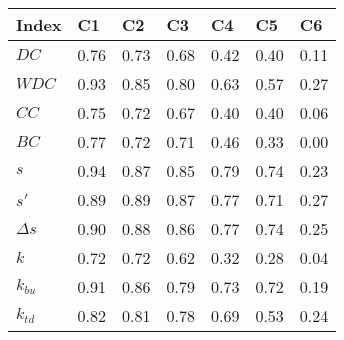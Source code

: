 \begin{table}[ht]
\centering
\begin{tabular}{lllllll}
  \hline
Index & C1 & C2 & C3 & C4 & C5 & C6 \\ 
  \hline
\(\displaystyle DC \) & {\color[HTML]{00D768} 0.76} & {\color[HTML]{EF2A00} 0.73} & {\color[HTML]{0051D7} 0.68} & {\color[HTML]{6200D7} 0.42} & {\color{orange} 0.40} & {\color[HTML]{9B9B9B} 0.11} \\ 
\(\displaystyle WDC \) &   {\color[HTML]{EF2A00} 0.93} & {\color[HTML]{00D768} 0.85} & {\color[HTML]{0051D7} 0.80} & {\color{orange} 0.63} & {\color[HTML]{6200D7} 0.57} & {\color[HTML]{9B9B9B} 0.27} \\ 
\(\displaystyle CC \) &   {\color[HTML]{00D768} 0.75} & {\color[HTML]{EF2A00} 0.72} & {\color[HTML]{0051D7} 0.67} & {\color[HTML]{6200D7} 0.40} & {\color{orange} 0.40} & {\color[HTML]{9B9B9B} 0.06} \\ 
\(\displaystyle BC \) &   {\color[HTML]{00D768} 0.77} & {\color[HTML]{0051D7} 0.72} & {\color[HTML]{EF2A00} 0.71} & {\color{orange} 0.46} & {\color[HTML]{6200D7} 0.33} & {\color[HTML]{9B9B9B} 0.00} \\ 
\(\displaystyle s \) &   {\color[HTML]{00D768} 0.94} & {\color[HTML]{EF2A00} 0.87} & {\color[HTML]{0051D7} 0.85} & {\color{orange} 0.79} & {\color[HTML]{6200D7} 0.74} & {\color[HTML]{9B9B9B} 0.23} \\ 
\(\displaystyle s' \) &   {\color[HTML]{EF2A00} 0.89} & {\color[HTML]{0051D7} 0.89} & {\color[HTML]{00D768} 0.87} & {\color[HTML]{6200D7} 0.77} & {\color{orange} 0.71} & {\color[HTML]{9B9B9B} 0.27} \\ 
\(\displaystyle \Delta s \) &   {\color[HTML]{00D768} 0.90} & {\color[HTML]{EF2A00} 0.88} & {\color[HTML]{0051D7} 0.86} & {\color[HTML]{6200D7} 0.77} & {\color{orange} 0.74} & {\color[HTML]{9B9B9B} 0.25} \\ 
\(\displaystyle k \) &   {\color[HTML]{00D768} 0.72} & {\color[HTML]{EF2A00} 0.72} & {\color[HTML]{0051D7} 0.62} & {\color[HTML]{6200D7} 0.32} & {\color{orange} 0.28} & {\color[HTML]{9B9B9B} 0.04} \\ 
\(\displaystyle k_{bu} \) &   {\color[HTML]{00D768} 0.91} & {\color[HTML]{EF2A00} 0.86} & {\color[HTML]{0051D7} 0.79} & {\color[HTML]{6200D7} 0.73} & {\color{orange} 0.72} & {\color[HTML]{9B9B9B} 0.19} \\ 
\(\displaystyle k_{td} \) &   {\color[HTML]{EF2A00} 0.82} & {\color[HTML]{00D768} 0.81} & {\color[HTML]{0051D7} 0.78} & {\color[HTML]{6200D7} 0.69} & {\color{orange} 0.53} & {\color[HTML]{9B9B9B} 0.24} \\ 

\end{tabular}
\end{table}
